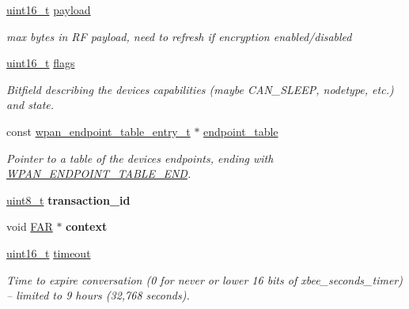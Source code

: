 \begin{DoxyCompactItemize}
\mbox{\label{group__wpan__aps_ga27ab4ae0aba390adfd9907aeebd88b9c}} 
\hyperlink{group__hal__dos_ga5a8b2dc9e45a9ee81a94ef304fb62505}{uint16\+\_\+t} \hyperlink{group__wpan__aps_ga27ab4ae0aba390adfd9907aeebd88b9c}{payload}
\begin{DoxyCompactList}\small\item\em max bytes in RF payload, need to refresh if encryption enabled/disabled \end{DoxyCompactList}\item 
\hyperlink{group__hal__dos_ga5a8b2dc9e45a9ee81a94ef304fb62505}{uint16\+\_\+t} \hyperlink{group__wpan__aps_ga1e87af3c18a2fd36c61faf89949bdc3f}{flags}
\begin{DoxyCompactList}\small\item\em Bitfield describing the device\textquotesingle{}s capabilities (maybe C\+A\+N\+\_\+\+S\+L\+E\+EP, nodetype, etc.) and state. \end{DoxyCompactList}\item 
const \hyperlink{structwpan__endpoint__table__entry__t}{wpan\+\_\+endpoint\+\_\+table\+\_\+entry\+\_\+t} $\ast$ \hyperlink{group__wpan__aps_gad7c834ea25a2f008caaf40ec08aa5a86}{endpoint\+\_\+table}
\begin{DoxyCompactList}\small\item\em Pointer to a table of the device\textquotesingle{}s endpoints, ending with \hyperlink{group__wpan__aps_gaac571cafa96f8201c714feb0634afa92}{W\+P\+A\+N\+\_\+\+E\+N\+D\+P\+O\+I\+N\+T\+\_\+\+T\+A\+B\+L\+E\+\_\+\+E\+ND}. \end{DoxyCompactList}\item 
\mbox{\label{group__wpan__aps_ga3f721807b5c6f0b5c39977390b5bf408}} 
\hyperlink{group__hal__dos_gae1affc9ca37cfb624959c866a73f83c2}{uint8\+\_\+t} {\bfseries transaction\+\_\+id}
\item 
\mbox{\label{group__wpan__aps_gaa91f8e864e06077c354e5f5216547758}} 
void \hyperlink{group__hal_gaef060b3456fdcc093a7210a762d5f2ed}{F\+AR} $\ast$ {\bfseries context}
\item 
\hyperlink{group__hal__dos_ga5a8b2dc9e45a9ee81a94ef304fb62505}{uint16\+\_\+t} \hyperlink{group__wpan__aps_ga7f1ad43d3bf79b40bc39dbb5a6c3a5ae}{timeout}
\begin{DoxyCompactList}\small\item\em Time to expire conversation (0 for never or lower 16 bits of xbee\+\_\+seconds\+\_\+timer) -- limited to 9 hours (32,768 seconds). \end{DoxyCompactList}\item 

\end{DoxyCompactItemize}
